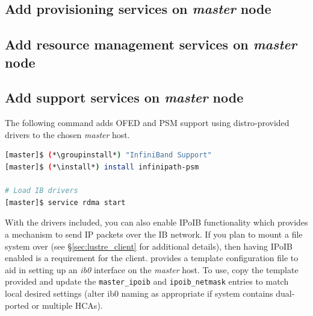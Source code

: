 \documentclass[letterpaper]{article}
\newcommand{\install}{yum -y install}
\newcommand{\groupinstall}{yum -y groupinstall}
\begin{document}

\subsection{Add provisioning services on {\em master} node} \label{sec:add_provisioning}



\subsection{Add resource management services on {\em master} node} \label{sec:add_rm}


\subsection{Add \InfiniBand{} support services on {\em master} node} \label{sec:add_ofed}

The following command adds OFED and PSM support using distro-provided drivers
to the chosen {\em master} host.

\begin{lstlisting}[language=bash,keywords={}]
[master]$ (*\groupinstall*) "InfiniBand Support"
[master]$ (*\install*) install infinipath-psm

# Load IB drivers
[master]$ service rdma start
\end{lstlisting}

With the \InfiniBand{} drivers included, you can also enable IPoIB functionality
which provides a mechanism to send IP packets over the IB network. If you plan
to mount a \Lustre{} file system over \InfiniBand{} (see \S\ref{sec:lustre_client}
for additional details), then having IPoIB enabled is a requirement for the
\Lustre{} client. \FSP{} provides a template configuration file to aid in setting up
an {\em ib0} interface on the {\em master} host. To use, copy the template
provided and update the \texttt{master\_ipoib} and
\texttt{ipoib\_netmask} entries to match local desired settings (alter ib0
naming as appropriate if system contains dual-ported or multiple HCAs). 
\end{document}
